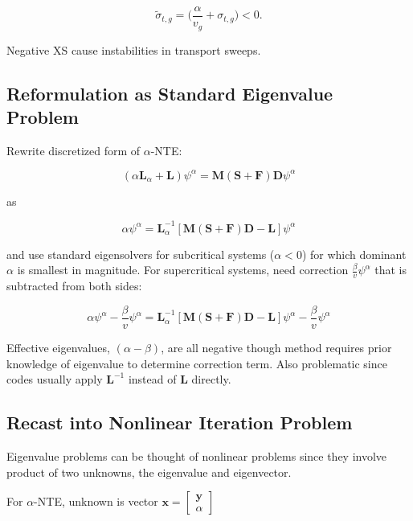 \documentclass{article}
\begin{document}
\begin{equation*}
\tilde{\sigma}_{t,g} = \bigg ( \frac{\alpha}{v_g} + \sigma_{t,g} \bigg ) < 0.
\end{equation*}

Negative XS cause instabilities in transport sweeps.

\subsection*{Reformulation as Standard Eigenvalue Problem}

Rewrite discretized form of $\alpha$-NTE:

\begin{equation*}
(\alpha \mathbf{L}_{\alpha} + \mathbf{L})\psi^{\alpha} = \mathbf{M}(\mathbf{S}+\mathbf{F})\mathbf{D}\psi^{\alpha}
\end{equation*}

as

\begin{equation*}
\alpha \psi^{\alpha} = \mathbf{L}_{\alpha}^{-1} [\mathbf{M}(\mathbf{S}+\mathbf{F})\mathbf{D} - \mathbf{L}]\psi^{\alpha}
\end{equation*}

and use standard eigensolvers for subcritical systems ($\alpha < 0$) for which dominant $\alpha$ is smallest in magnitude. For supercritical systems, need correction $\frac{\beta}{v}\psi^{\alpha}$ that is subtracted from both sides:

\begin{equation*}
\alpha \psi^{\alpha} - \frac{\beta}{v}\psi^{\alpha} = \mathbf{L}_{\alpha}^{-1} [\mathbf{M}(\mathbf{S}+\mathbf{F})\mathbf{D} - \mathbf{L}]\psi^{\alpha} - \frac{\beta}{v}\psi^{\alpha}
\end{equation*}

Effective eigenvalues, $(\alpha - \beta)$, are all negative though method requires prior knowledge of eigenvalue to determine correction term. Also problematic since codes usually apply $\mathbf{L}^{-1}$ instead of $\mathbf{L}$ directly.

\subsection*{Recast into Nonlinear Iteration Problem}

Eigenvalue problems can be thought of nonlinear problems since they involve product of two unknowns, the eigenvalue and eigenvector.

For $\alpha$-NTE, unknown is vector $\mathbf{x} = \begin{bmatrix} \mathbf{y} \\ \alpha \end{bmatrix}$ 
\end{document}

